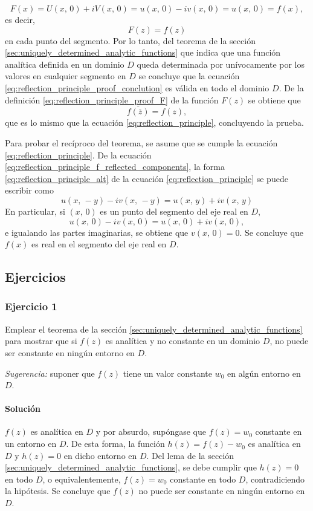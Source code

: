 \documentclass[a4paper]{report}
\begin{document}
\[
 F(x)=U(x,\,0)+iV(x,\,0)=u(x,\,0)-iv(x,\,0)=u(x,\,0)=f(x),
\]
es decir,
\begin{equation}\label{eq:reflection_principle_proof_conclution}
 F(z)=f(z)
\end{equation}
en cada punto del segmento. Por lo tanto, del teorema de la sección \ref{sec:uniquely_determined_analytic_functions} que indica que una función analítica definida en un dominio \(D\) queda determinada por unívocamente por los valores en cualquier segmento en \(D\) se concluye que la ecuación \ref{eq:reflection_principle_proof_conclution} es válida en todo el dominio \(D\). De la definición \ref{eq:reflection_principle_proof_F} de la función \(F(z)\) se obtiene que 
\begin{equation}\label{eq:reflection_principle_alt}
 \overline{f(\overline{z})}=f(z), 
\end{equation}
que es lo mismo que la ecuación \ref{eq:reflection_principle}, concluyendo la prueba.

Para probar el recíproco del teorema, se asume que se cumple la ecuación \ref{eq:reflection_principle}. De la ecuación \ref{eq:reflection_principle_f_reflected_components}, la forma \ref{eq:reflection_principle_alt} de la ecuación \ref{eq:reflection_principle} se puede escribir como 
\[
 u(x,\,-y)-iv(x,\,-y)=u(x,\,y)+iv(x,\,y)
\]
En particular, si \((x,\,0)\) es un punto del segmento del eje real en \(D\),
\[
 u(x,\,0)-iv(x,\,0)=u(x,\,0)+iv(x,\,0),
\]
e igualando las partes imaginarias, se obtiene que \(v(x,\,0)=0\). Se concluye que \(f(x)\) es real en el segmento del eje real en \(D\). 

\subsection{Ejercicios}

\subsubsection{Ejercicio 1}

Emplear el teorema de la sección \ref{sec:uniquely_determined_analytic_functions} para mostrar que si  \(f(z)\) es analítica y no constante en un dominio \(D\), no puede ser constante en ningún entorno en \(D\).

\emph{Sugerencia:} suponer que \(f(z)\) tiene un valor constante \(w_0\) en algún entorno en \(D\).

\paragraph{Solución} \(f(z)\) es analítica en \(D\) y por absurdo, supóngase que \(f(z)=w_0\) constante en un entorno en \(D\). De esta forma, la función \(h(z)=f(z)-w_0\) es analítica en \(D\) y \(h(z)=0\) en dicho entorno en \(D\). Del lema de la sección \ref{sec:uniquely_determined_analytic_functions}, se debe  cumplir que \(h(z)=0\) en todo \(D\), o equivalentemente, \(f(z)=w_0\) constante en todo \(D\), contradiciendo la hipótesis. Se concluye que \(f(z)\) no puede ser constante en ningún entorno en \(D\).
\end{document}
